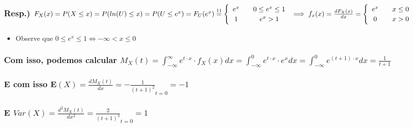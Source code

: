\documentclass[portuguese]{article}
\begin{document}
\subsubsection*{\textmd{Resp.) $F_{X}(x)=P(X\leq x)=P(ln(U)\leq x)=P(U\leq e^{x})=F_{U}(e^{x})\protect\overset{11}{=}\protect\begin{cases}
\protect\begin{array}{c}
e^{x}\protect\\
1
\protect\end{array} & \protect\begin{array}{c}
0\leq e^{x}\leq1\protect\\
e^{x}>1
\protect\end{array}\protect\end{cases}\protect\implies f_{x}(x)=\frac{dF_{X}(x)}{dx}=\protect\begin{cases}
\protect\begin{array}{c}
e^{x}\protect\\
0
\protect\end{array} & \protect\begin{array}{c}
x\leq0\protect\\
x>0
\protect\end{array}\protect\end{cases}$}}
\begin{itemize}
\item Observe que $0\leq e^{x}\leq1\Longleftrightarrow-\infty<x\leq0$
\end{itemize}

\subsubsection*{\textmd{Com isso, podemos calcular $M_{X}(t)=\int_{-\infty}^{\infty}e^{t\cdot x}\cdot f_{X}(x)dx=\int_{-\infty}^{0}e^{t\cdot x}\cdot e^{x}dx=\int_{-\infty}^{0}e^{(t+1)\cdot x}dx=\frac{1}{t+1}$}}


\subsubsection*{\textmd{E com isso $\mathbf{E}(X)=\frac{dM_{X}(t)}{dx}=-\frac{1}{(t+1)^{2}}_{t=0}=-1$}}


\subsubsection*{\textmd{E $Var(X)=\frac{d^{2}M_{X}(t)}{dx^{2}}=\frac{2}{(t+1)^{3}}_{t=0}=1$}}
\end{document}
